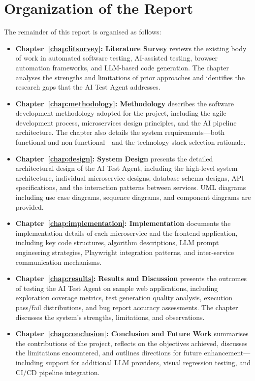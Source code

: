\section{Organization of the Report}
\label{sec:report_organization}

The remainder of this report is organised as follows:

\begin{itemize}
    \item \textbf{Chapter~\ref{chap:litsurvey}: Literature Survey} reviews the existing body of work in automated software testing, AI-assisted testing, browser automation frameworks, and LLM-based code generation. The chapter analyses the strengths and limitations of prior approaches and identifies the research gaps that the AI Test Agent addresses.

    \item \textbf{Chapter~\ref{chap:methodology}: Methodology} describes the software development methodology adopted for the project, including the agile development process, microservices design principles, and the AI pipeline architecture. The chapter also details the system requirements---both functional and non-functional---and the technology stack selection rationale.

    \item \textbf{Chapter~\ref{chap:design}: System Design} presents the detailed architectural design of the AI Test Agent, including the high-level system architecture, individual microservice designs, database schema designs, API specifications, and the interaction patterns between services. UML diagrams including use case diagrams, sequence diagrams, and component diagrams are provided.

    \item \textbf{Chapter~\ref{chap:implementation}: Implementation} documents the implementation details of each microservice and the frontend application, including key code structures, algorithm descriptions, LLM prompt engineering strategies, Playwright integration patterns, and inter-service communication mechanisms.

    \item \textbf{Chapter~\ref{chap:results}: Results and Discussion} presents the outcomes of testing the AI Test Agent on sample web applications, including exploration coverage metrics, test generation quality analysis, execution pass/fail distributions, and bug report accuracy assessments. The chapter discusses the system's strengths, limitations, and observations.

    \item \textbf{Chapter~\ref{chap:conclusion}: Conclusion and Future Work} summarises the contributions of the project, reflects on the objectives achieved, discusses the limitations encountered, and outlines directions for future enhancement---including support for additional LLM providers, visual regression testing, and CI/CD pipeline integration.
\end{itemize}
